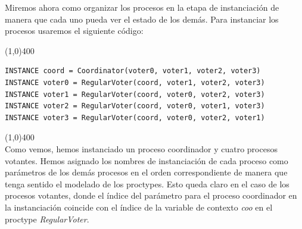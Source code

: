 \documentclass[titlepage, 12pt]{book}
\begin{document}
Miremos ahora como organizar los procesos en la etapa de instanciaci\'on de manera que cada uno pueda ver el estado de los dem\'as. Para instanciar los procesos usaremos el siguiente c\'odigo:

\noindent \line(1,0){400}
\begin{verbatim}
INSTANCE coord = Coordinator(voter0, voter1, voter2, voter3)
INSTANCE voter0 = RegularVoter(coord, voter1, voter2, voter3)
INSTANCE voter1 = RegularVoter(coord, voter0, voter2, voter3)
INSTANCE voter2 = RegularVoter(coord, voter0, voter1, voter3)
INSTANCE voter3 = RegularVoter(coord, voter0, voter2, voter1)
\end{verbatim}
\noindent \line(1,0){400}
~\\

Como vemos, hemos instanciado un proceso coordinador y cuatro procesos votantes. Hemos asignado los nombres de instanciaci\'on de cada proceso como par\'ametros de los dem\'as procesos en el orden correspondiente de manera que tenga sentido el modelado de los proctypes. Esto queda claro en el caso de los procesos votantes, donde el \'indice del par\'ametro para el proceso coordinador en la instanciaci\'on coincide con el \'indice de la variable de contexto \textit{coo} en el proctype \textit{RegularVoter}.
\end{document}
